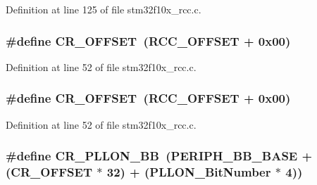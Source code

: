 Definition at line 125 of file stm32f10x\+\_\+rcc.\+c.

\subsubsection[{\texorpdfstring{C\+R\+\_\+\+O\+F\+F\+S\+ET}{CR_OFFSET}}]{\setlength{\rightskip}{0pt plus 5cm}\#define C\+R\+\_\+\+O\+F\+F\+S\+ET~({\bf R\+C\+C\+\_\+\+O\+F\+F\+S\+ET} + 0x00)}\hypertarget{group___r_c_c___private___defines_gafa1d3d0ea72132df651c76fc1bdffffc}{}\label{group___r_c_c___private___defines_gafa1d3d0ea72132df651c76fc1bdffffc}


Definition at line 52 of file stm32f10x\+\_\+rcc.\+c.

\subsubsection[{\texorpdfstring{C\+R\+\_\+\+O\+F\+F\+S\+ET}{CR_OFFSET}}]{\setlength{\rightskip}{0pt plus 5cm}\#define C\+R\+\_\+\+O\+F\+F\+S\+ET~({\bf R\+C\+C\+\_\+\+O\+F\+F\+S\+ET} + 0x00)}\hypertarget{group___r_c_c___private___defines_gafa1d3d0ea72132df651c76fc1bdffffc}{}\label{group___r_c_c___private___defines_gafa1d3d0ea72132df651c76fc1bdffffc}


Definition at line 52 of file stm32f10x\+\_\+rcc.\+c.

\subsubsection[{\texorpdfstring{C\+R\+\_\+\+P\+L\+L\+O\+N\+\_\+\+BB}{CR_PLLON_BB}}]{\setlength{\rightskip}{0pt plus 5cm}\#define C\+R\+\_\+\+P\+L\+L\+O\+N\+\_\+\+BB~({\bf P\+E\+R\+I\+P\+H\+\_\+\+B\+B\+\_\+\+B\+A\+SE} + ({\bf C\+R\+\_\+\+O\+F\+F\+S\+ET} $\ast$ 32) + ({\bf P\+L\+L\+O\+N\+\_\+\+Bit\+Number} $\ast$ 4))}\hypertarget{group___r_c_c___private___defines_ga3f1fb2589cb8b5ac2f7121aba1135a5f}{}\label{group___r_c_c___private___defines_ga3f1fb2589cb8b5ac2f7121aba1135a5f}


